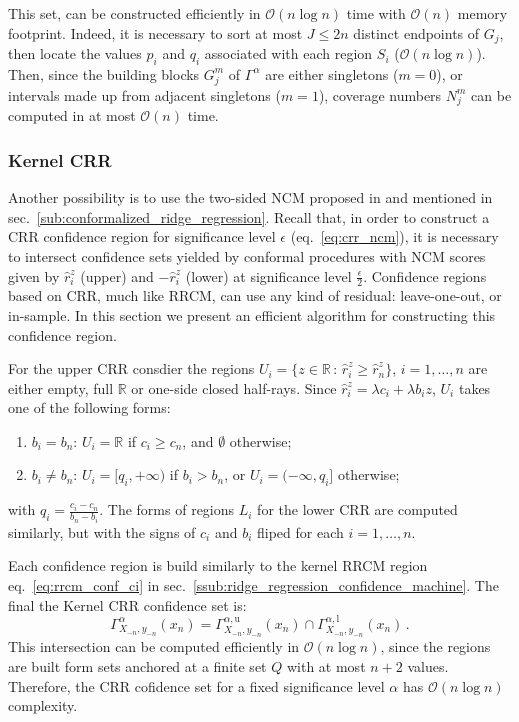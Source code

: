 \documentclass{ITaSconf}
\newcommand{\BigO}{\mathcal{O}}
\newcommand{\Real}{\mathbb{R}}
\begin{document}
This set, can be constructed efficiently in $\BigO(n \log{} n)$ time with $\BigO(n)$
memory footprint. Indeed, it is necessary to sort at most $J\leq 2n$ distinct endpoints
of $G_j$, then locate the values $p_i$ and $q_i$ associated with each region $S_i$
($\BigO(n \log{} n)$). Then, since the building blocks $G^m_j$ of $\Gamma^\alpha$
are either singletons ($m=0$), or intervals made up from adjacent singletons ($m=1$),
coverage numbers $N^m_j$ can be computed in at most $\BigO(n)$ time.


\subsubsection{Kernel CRR} %
\label{ssub:kernel_crr}
Another possibility is to use the two-sided NCM proposed in \cite{BurVovk2014} and
mentioned in sec.~\ref{sub:conformalized_ridge_regression}. Recall that, in order
to construct a CRR confidence region for significance level $\epsilon$ (eq.~\ref{eq:crr_ncm}),
it is necessary to intersect confidence sets yielded by conformal procedures with NCM
scores given by $\hat{r}_i^z$ (upper) and $-\hat{r}_i^z$ (lower) at significance level
$\frac{\epsilon}{2}$. Confidence regions based on CRR, much like RRCM, can use any kind
of residual: leave-one-out, or in-sample. In this section we present an efficient
algorithm for constructing this confidence region.

For the upper CRR consdier the regions $U_i = \{z\in\Real\,:\, \hat{r}_i^z \geq \hat{r}_n^z\}$,
$i=1,\ldots, n$ are either empty, full $\Real$ or one-side closed half-rays. Since
$\hat{r}_i^z = \lambda c_i + \lambda b_i z$, $U_i$ takes one of the following forms:
\begin{enumerate}
  \item $b_i=b_n$: $U_i = \Real$ if $c_i\geq c_n$, and $\emptyset$ otherwise;
  \item $b_i\neq b_n$: $U_i = [q_i, +\infty)$ if $b_i>b_n$, or
  $U_i = (-\infty, q_i]$ otherwise;
\end{enumerate}
with $q_i = \frac{c_i-c_n}{b_n-b_i}$. The forms of regions $L_i$ for the lower CRR
are computed similarly, but with the signs of $c_i$ and $b_i$ fliped for each $i=1, \ldots, n$.

Each confidence region is build similarly to the kernel RRCM region eq.~\ref{eq:rrcm_conf_ci}
in sec.~\ref{ssub:ridge_regression_confidence_machine}. The final the Kernel CRR
confidence set is:
\begin{equation} \label{eq:crr_conf_ci}
  \Gamma_{X_{-n}, y_{-n}}^\alpha(x_n)
    = \Gamma_{X_{-n}, y_{-n}}^{\alpha,\text{u}}(x_n)
    \cap \Gamma_{X_{-n}, y_{-n}}^{\alpha,\text{l}}(x_n)
    \,.
\end{equation}
This intersection can be computed efficiently in $\BigO(n \log{} n)$, since the regions
are built form sets anchored at a finite set $Q$ with at most $n+2$ values. Therefore,
the CRR cofidence set for a fixed significance level $\alpha$ has $\BigO(n\log{} n)$
complexity.
\end{document}
